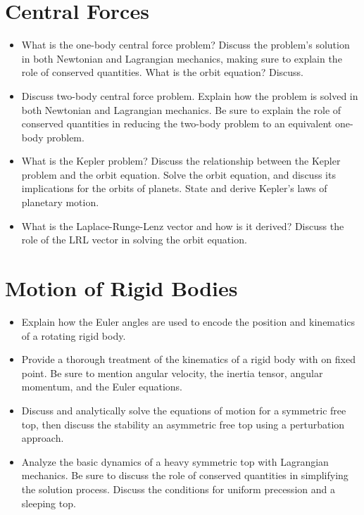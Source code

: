 \section{Central Forces}

\begin{itemize}

    \item What is the one-body central force problem? Discuss the problem's solution in both Newtonian and Lagrangian mechanics, making sure to explain the role of conserved quantities. What is the orbit equation? Discuss.

    \item Discuss two-body central force problem. Explain how the problem is solved in both Newtonian and Lagrangian mechanics. Be sure to explain the role of conserved quantities in reducing the two-body problem to an equivalent one-body problem.

    \item What is the Kepler problem? Discuss the relationship between the Kepler problem and the orbit equation. Solve the orbit equation, and discuss its implications for the orbits of planets. State and derive Kepler's laws of planetary motion.

    \item What is the Laplace-Runge-Lenz vector and how is it derived? Discuss the role of the LRL vector in solving the orbit equation.

\end{itemize}

\section{Motion of Rigid Bodies}

\begin{itemize}

    \item Explain how the Euler angles are used to encode the position and kinematics of a rotating rigid body.

    \item Provide a thorough treatment of the kinematics of a rigid body with on fixed point. Be sure to mention angular velocity, the inertia tensor, angular momentum, and the Euler equations.

    \item Discuss and analytically solve the equations of motion for a symmetric free top, then discuss the stability an asymmetric free top using a perturbation approach.

    \item Analyze the basic dynamics of a heavy symmetric top with Lagrangian mechanics. Be sure to discuss the role of conserved quantities in simplifying the solution process. Discuss the conditions for uniform precession and a sleeping top.

\end{itemize}

